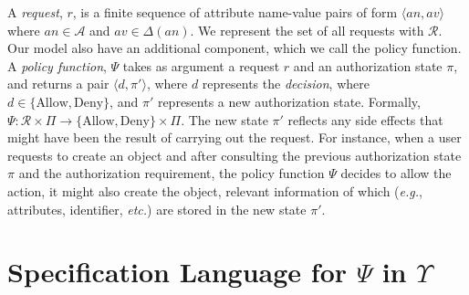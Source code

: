 \documentclass[a4paper,10pt]{article}
\newcommand{\eg}{\textit{e.g.}\xspace}
\newcommand{\etc}{\textit{etc.}\xspace}
\newcommand{\state}{\ensuremath{\pi}\xspace}
\newcommand{\stateset}{\ensuremath{\Pi}\xspace}
\newcommand{\policyfunc}{\ensuremath{\Psi}\xspace}
\newcommand{\cR}{\ensuremath{\mathcal{R}}\xspace}
\newcommand{\cA}{\ensuremath{\mathcal{A}}\xspace}
\newcommand{\dom}{\ensuremath{\Delta}\xspace} %
\newcommand{\Allow}{\ensuremath{\mbox{Allow}}\xspace}
\newcommand{\Deny}{\ensuremath{\mbox{Deny}}\xspace}
\newcommand{\abac}{\ensuremath{\Upsilon}\xspace}
\begin{document}
A \emph{request}, $r$, is a finite sequence of attribute name-value pairs of form $\langle an, av\rangle$ 
where $an\in\cA$ and $av\in\dom(an)$. We represent the set of all requests with \cR. 
Our model also have an additional component, which we call the policy function. A \emph{policy function}, \policyfunc takes 
as argument a request $r$ and an authorization state \state, and returns a pair $\langle d, \state'\rangle$, where $d$ represents the \emph{decision}, 
where $d \in \{\Allow, \Deny\}$, and $\state'$ represents a new authorization state. 
Formally, $\policyfunc : \cR \times \stateset \rightarrow \{\Allow, \Deny\} \times \stateset$. 
The new state $\state'$ reflects any side effects that might have been the result of carrying out the request. For instance, 
when a user requests to create an object and after consulting the previous authorization state \state and the authorization requirement, 
the policy function \policyfunc 
decides to allow the action, it might also create the object, relevant information of which (\eg, attributes, identifier, \etc) 
are stored in the new state $\state'$. 

\section{Specification Language for \policyfunc in \abac} 
\end{document}
